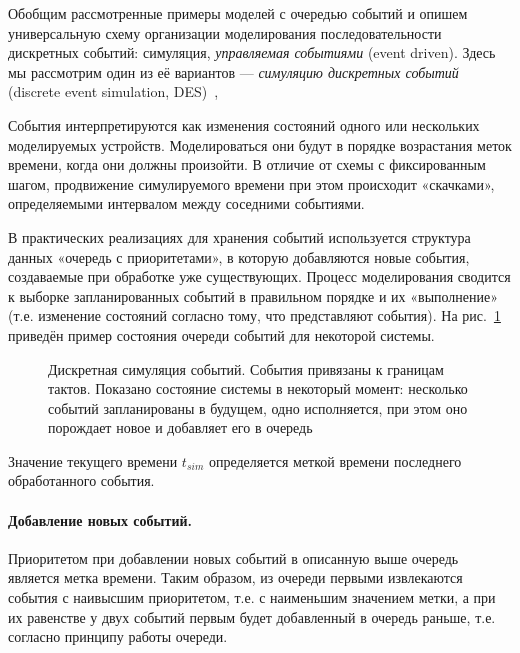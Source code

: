 Обобщим рассмотренные примеры моделей с очередью событий и опишем универсальную схему организации моделирования последовательности дискретных событий: симуляция, \textit{управляемая событиями} (\abbr event driven). Здесь мы рассмотрим один из её вариантов — \textit{симуляцию дискретных событий} (\abbr discrete event simulation, DES)~\cite{fujimoto-parallel-dist-sim, introduction-to-des, Cain02preciseand},

События интерпретируются как изменения состояний одного или нескольких моделируемых устройств. Моделироваться они будут в порядке возрастания меток времени, когда они должны произойти. В отличие от схемы с фиксированным шагом, продвижение симулируемого времени при этом происходит «скачками», определяемыми интервалом между соседними событиями. 

В практических реализациях для хранения событий используется структура данных «очередь с приоритетами», в которую добавляются новые события, создаваемые при обработке уже существующих. Процесс моделирования сводится к выборке запланированных событий в правильном порядке и их «выполнение» (т.е. изменение состояний согласно тому, что представляют события). На рис. \ref{fig:queue1} приведён пример состояния очереди событий для некоторой системы.

\begin{figure}[htp]
    \centering
    \caption[Дискретная симуляция событий]{Дискретная симуляция событий. События привязаны к границам тактов. Показано состояние системы в некоторый момент: несколько событий запланированы в будущем, одно исполняется, при этом оно порождает новое и добавляет его в очередь}
    \label{fig:queue1}
\end{figure}

Значение текущего времени $t_{sim}$ определяется меткой времени последнего обработанного события.

\paragraph{Добавление новых событий.} Приоритетом при добавлении новых событий в описанную выше очередь является метка времени. Таким образом, из очереди первыми извлекаются события с наивысшим приоритетом, т.е. с наименьшим значением метки, а при их равенстве у двух событий первым будет добавленный в очередь раньше, т.е. согласно принципу работы очереди.

%

